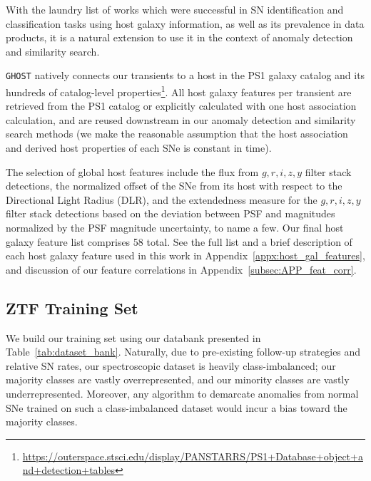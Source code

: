 \documentclass[twocolumn]{aastex63}
\begin{document}
With the laundry list of works which were successful in SN identification and classification tasks using host galaxy information, as well as its prevalence in data products, it is a natural extension to use it in the context of anomaly detection and similarity search. \par

\texttt{GHOST} \citep{Gagliano2021} natively connects our transients to a host in the PS1 galaxy catalog and its hundreds of catalog-level properties\footnote{\url{https://outerspace.stsci.edu/display/PANSTARRS/PS1+Database+object+and+detection+tables}}. All host galaxy features per transient are retrieved from the PS1 catalog or explicitly calculated with one host association calculation, and are reused downstream in our anomaly detection and similarity search methods (we make the reasonable assumption that the host association and derived host properties of each SNe is constant in time). \par

The selection of global host features include the \cite{Kron1980} flux from $g,r,i,z,y$ filter stack detections, the normalized offset of the SNe from its host with respect to the Directional Light Radius (DLR), and the extendedness measure for the $g,r,i,z,y$ filter stack detections based on the deviation between PSF and \cite{Kron1980} magnitudes normalized by the PSF magnitude uncertainty, to name a few. Our final host galaxy feature list comprises 58 total. See the full list and a brief description of each host galaxy feature used in this work in Appendix~\ref{appx:host_gal_features}, and discussion of our feature correlations in Appendix~\ref{subsec:APP_feat_corr}. \par


\subsection{ZTF Training Set} \label{subsec:train_set}

We build our training set using our databank presented in Table~\ref{tab:dataset_bank}. Naturally, due to pre-existing follow-up strategies and relative SN rates, our spectroscopic dataset is heavily class-imbalanced; our majority classes are vastly overrepresented, and our minority classes are vastly underrepresented. Moreover, any algorithm to demarcate anomalies from normal SNe trained on such a class-imbalanced dataset would incur a bias toward the majority classes. \par
\end{document}
